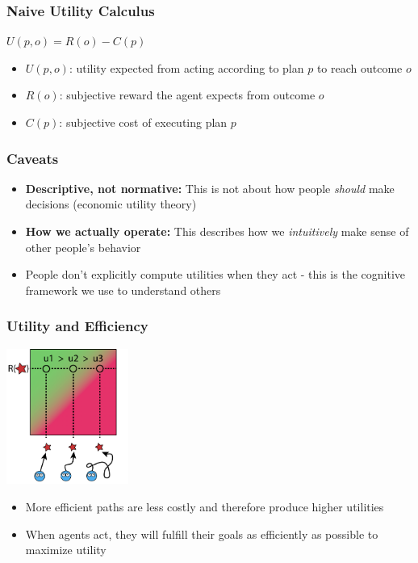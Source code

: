 \documentclass{beamer}
\begin{document}
\begin{frame}
\frametitle{Naive Utility Calculus}
\begin{center}
\Large $U(p, o) = R(o) - C(p)$
\end{center}
\vspace{0.5cm}
\begin{itemize}
    \item $U(p, o)$: utility expected from acting according to plan $p$ to reach outcome $o$
    \item $R(o)$: subjective reward the agent expects from outcome $o$
    \item $C(p)$: subjective cost of executing plan $p$
\end{itemize}
\end{frame}

\begin{frame}
\frametitle{Caveats}
\begin{itemize}
    \item \textbf{Descriptive, not normative:} This is not about how people \textit{should} make decisions (economic utility theory)
    \item \textbf{How we actually operate:} This describes how we \textit{intuitively} make sense of other people's behavior
    \item People don't explicitly compute utilities when they act - this is the cognitive framework we use to understand others
\end{itemize}
\end{frame}

\begin{frame}
\frametitle{Utility and Efficiency}
\begin{center}
\includegraphics[width=0.3\textwidth]{utility2.png}
\end{center}
\vspace{0.3cm}
\begin{itemize}
    \item More efficient paths are less costly and therefore produce higher utilities
    \item When agents act, they will fulfill their goals as efficiently as possible to maximize utility
\end{itemize}
\end{frame}
\end{document}
